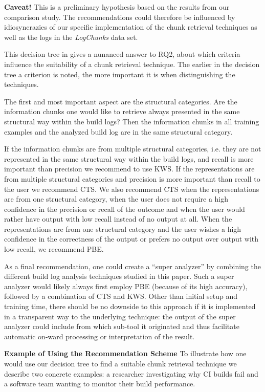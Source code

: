 \noindent
\textbf{Caveat!} This is a preliminary hypothesis based on the results from our comparison study.
The recommendations could therefore be influenced by idiosyncrazies of our specific implementation of the chunk retrieval techniques as well as the logs in the \emph{LogChunks} data set.

This decision tree in  gives a nunanced answer to RQ2, about which criteria influence the suitability of a chunk retrieval technique.
The earlier in the decision tree a criterion is noted, the more important it is when distinguishing the techniques.

The first and most important aspect are the structural categories.
Are the information chunks one would like to retrieve always presented in the same structural way within the build logs?
Then the information chunks in all training examples and the analyzed build log are in the same structural category.

If the information chunks are from multiple structural categories, i.e. they are not represented in the same structural way within the build logs, and recall is more important than precision we recommend to use KWS\@.
If the representations are from multiple structural categories and precision is more important than recall to the user we recommend CTS\@.
We also recommend CTS when the representations are from one structural category, when the user does not require a high confidence in the precision or recall of the outcome and when the user would rather have output with low recall instead of no output at all.
When the representations are from one structural category and the user wishes a high confidence in the correctness of the output or prefers no output over output with low recall, we recommend PBE\@.

As a final recommendation, one could create a ``super analyzer'' by combining the different build log analysis techniques studied in this paper. Such a super analyzer would likely always first employ PBE (because of its high accuracy), followed by a combination of CTS and KWS. Other than initial setup and training time, there should be no downside to this approach if it is implemented in a transparent way to the underlying technique: the output of the super analyzer could include from which sub-tool it originated and thus facilitate automatic on-ward processing or interpretation of the result.


\noindent
\textbf{Example of Using the Recommendation Scheme}
To illustrate how one would use our decision tree to find a suitable chunk retrieval technique we describe two concrete examples: a researcher investigating why CI builds fail and a software team wanting to monitor their build performance.

